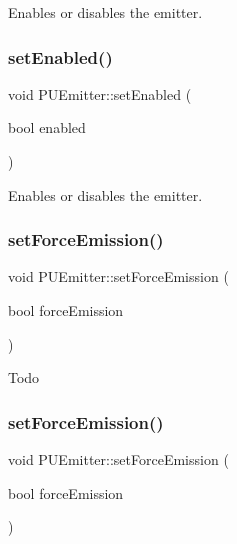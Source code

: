 Enables or disables the emitter. \mbox{\label{classPUEmitter_a4f257171b370033d2ca3544867912645}} 
\subsubsection{\texorpdfstring{set\+Enabled()}{setEnabled()}\hspace{0.1cm}{\footnotesize\ttfamily [2/2]}}
{\footnotesize\ttfamily void P\+U\+Emitter\+::set\+Enabled (\begin{DoxyParamCaption}\item[{bool}]{enabled }\end{DoxyParamCaption})}

Enables or disables the emitter. \mbox{\label{classPUEmitter_a95b92d550215d868305629b7a79b244b}} 
\subsubsection{\texorpdfstring{set\+Force\+Emission()}{setForceEmission()}\hspace{0.1cm}{\footnotesize\ttfamily [1/2]}}
{\footnotesize\ttfamily void P\+U\+Emitter\+::set\+Force\+Emission (\begin{DoxyParamCaption}\item[{bool}]{force\+Emission }\end{DoxyParamCaption})}

Todo \mbox{\label{classPUEmitter_a95b92d550215d868305629b7a79b244b}} 
\subsubsection{\texorpdfstring{set\+Force\+Emission()}{setForceEmission()}\hspace{0.1cm}{\footnotesize\ttfamily [2/2]}}
{\footnotesize\ttfamily void P\+U\+Emitter\+::set\+Force\+Emission (\begin{DoxyParamCaption}\item[{bool}]{force\+Emission }\end{DoxyParamCaption})}

